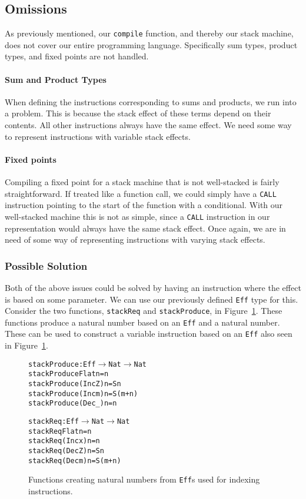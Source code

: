 \subsection{Omissions}
\label{sec:omissions}
As previously mentioned, our \texttt{compile} function, and thereby our stack machine, does not cover our entire programming language. Specifically sum types, product types, and fixed points are not handled. 

\paragraph{Sum and Product Types}
When defining the instructions corresponding to sums and products, we run into a problem. This is because the stack effect of these terms depend on their contents. All other instructions always have the same effect. We need some way to represent instructions with variable stack effects.

\paragraph{Fixed points}
Compiling a fixed point for a stack machine that is not well-stacked is fairly straightforward. If treated like a function call, we could simply have a \texttt{CALL} instruction pointing to the start of the function with a conditional. With our well-stacked machine this is not as simple, since a \texttt{CALL} instruction in our representation would always have the same stack effect. Once again, we are in need of some way of representing instructions with varying stack effects.

\subsubsection{Possible Solution}
Both of the above issues could be solved by having an instruction where the effect is based on some parameter. We can use our previously defined \texttt{Eff} type for this. Consider the two functions, \texttt{stackReq} and \texttt{stackProduce}, in Figure~\ref{fig:stack_effect_functions}. These functions produce a natural number based on an \texttt{Eff} and a natural number. These can be used to construct a variable instruction based on an \texttt{Eff} also seen in Figure~\ref{fig:stack_effect_functions}. 

\begin{figure}
\begin{alltt}
stackProduce : Eff \(\to\) Nat \(\to\) Nat
stackProduce Flat n = n
stackProduce (Inc Z) n = S n
stackProduce (Inc m) n = S (m+n)
stackProduce (Dec _) n = n

stackReq : Eff \(\to\) Nat \(\to\) Nat
stackReq Flat n = n
stackReq (Inc x) n = n
stackReq (Dec Z) n = S n
stackReq (Dec m) n = S (m+n)
\end{alltt}
\caption{Functions creating natural numbers from \texttt{Eff}s used for indexing instructions.}
\label{fig:stack_effect_functions}
\end{figure}

